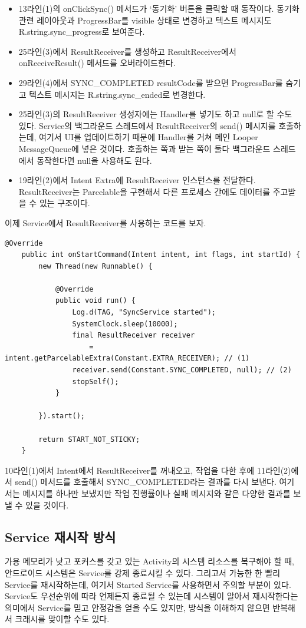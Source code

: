 \begin{itemize}
\item 13라인(1)의 onClickSync() 메서드가 `동기화' 버튼을 클릭할 때 동작이다. 동기화 관련 레이아웃과 ProgressBar를 visible 상태로 변경하고 텍스트 메시지도 R.string.sync\_progress로 보여준다.
\item 25라인(3)에서 ResultReceiver를 생성하고 ResultReceiver에서 onReceiveResult() 메서드를 오버라이드한다. 
\item 29라인(4)에서 SYNC\_COMPLETED resultCode를 받으면 ProgressBar를 숨기고 텍스트 메시지는 R.string.sync\_ended로 변경한다. 
\item 25라인(3)의 ResultReceiver 생성자에는 Handler를 넣기도 하고 null로 할 수도 있다. Service의 백그라운드 스레드에서 ResultReceiver의 send() 메시지를 호출하는데, 여기서 UI를 업데이트하기 때문에 Handler를 거쳐 메인 Looper MessageQueue에 넣은 것이다. 호출하는 쪽과 받는 쪽이 둘다 백그라운드 스레드에서 동작한다면 null을 사용해도 된다.
\item 19라인(2)에서 Intent Extra에 ResultReceiver 인스턴스를 전달한다. ResultReceiver는 Parcelable을 구현해서 다른 프로세스 간에도 데이터를 주고받을 수 있는 구조이다.
\end{itemize}

이제 Service에서 ResultReceiver를 사용하는 코드를 보자.
\begin{lstlisting}[frame=single]
	@Override
	public int onStartCommand(Intent intent, int flags, int startId) {
   		new Thread(new Runnable() {
      
      		@Override
     		public void run() {
         		Log.d(TAG, "SyncService started");
         		SystemClock.sleep(10000);
         		final ResultReceiver receiver 
         			= intent.getParcelableExtra(Constant.EXTRA_RECEIVER); // (1)
         		receiver.send(Constant.SYNC_COMPLETED, null); // (2)
         		stopSelf();
     		}

   		}).start();
   
   		return START_NOT_STICKY;
	}
\end{lstlisting}	
10라인(1)에서 Intent에서 ResultReceiver를 꺼내오고, 작업을 다한 후에 11라인(2)에서 send() 메서드를 호출해서 SYNC\_COMPLETED라는 결과를 다시 보낸다. 여기서는 메시지를 하나만 보냈지만 작업 진행률이나 실패 메시지와 같은 다양한 결과를 보낼 수 있을 것이다.

\subsection{Service 재시작 방식}
가용 메모리가 낮고 포커스를 갖고 있는 Activity의 시스템 리소스를 복구해야 할 때, 안드로이드 시스템은 Service를 강제 종료시킬 수 있다. 
그리고서 가능한 한 빨리 Service를 재시작하는데, 여기서 Started Service를 사용하면서 주의할 부분이 있다.
Service도 우선순위에 따라 언제든지 종료될 수 있는데 시스템이 알아서 재시작한다는 의미에서 Service를 믿고 안정감을 얻을 수도 있지만, 방식을 이해하지 않으면 반복해서 크래시를 맞이할 수도 있다.\\

